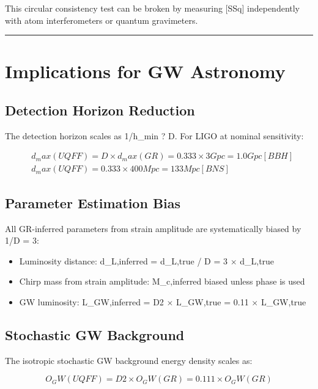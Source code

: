 \documentclass[12pt,a4paper]{article}
\begin{document}
This circular consistency test can be broken by measuring [SSq] independently with atom interferometers or quantum gravimeters.

\medskip\hrule\medskip

\section{Implications for GW Astronomy}

\subsection{Detection Horizon Reduction}

The detection horizon scales as 1/h\_min ? D. For LIGO at nominal sensitivity:

\begin{equation}
\begin{aligned}
  & d_max(UQFF) = D \times d_max(GR) = 0.333 \times 3 Gpc = 1.0 Gpc   [BBH] \\
  & d_max(UQFF) = 0.333 \times 400 Mpc = 133 Mpc               [BNS]
\end{aligned}
\end{equation}

\subsection{Parameter Estimation Bias}

All GR-inferred parameters from strain amplitude are systematically biased by 1/D = 3:

\begin{itemize}
  \item Luminosity distance: d\_L,inferred = d\_L,true / D = 3 $\times$ d\_L,true
  \item Chirp mass from strain amplitude: M\_c,inferred biased unless phase is used
  \item GW luminosity: L\_GW,inferred = D2 $\times$ L\_GW,true = 0.11 $\times$ L\_GW,true
\end{itemize}

\subsection{Stochastic GW Background}

The isotropic stochastic GW background energy density scales as:

\begin{equation}
O_GW(UQFF) = D2 \times O_GW(GR) = 0.111 \times O_GW(GR)
\end{equation}
\end{document}
